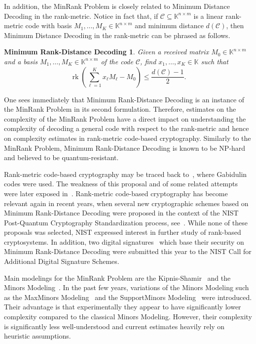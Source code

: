 \documentclass[utf8,latin1]{article}
\newtheorem*{mdd}{Minimum Rank-Distance Decoding}
\DeclareMathOperator{\rk}{rk}
\newcommand{\KK}{\mathbb{K}}
\begin{document}
In addition, the MinRank Problem is closely related to Minimum Distance Decoding in the rank-metric. Notice in fact that, if $\mathcal{C}\subseteq\KK^{n\times m}$ is a linear rank-metric code with basis $M_1,\dots,M_K\in\KK^{n\times m}$ and minimum distance $d(\mathcal{C})$, then Minimum Distance Decoding in the rank-metric can be phrased as follows.

\begin{mdd}
Given a received matrix $M_0\in\KK^{n\times m}$ and a basis $M_1,\dots,M_K\in\KK^{n\times m}$ of the code $\mathcal{C}$, find $x_1,\dots,x_K\in\KK$ such that
\[
\rk\left(\sum_{\ell=1}^K x_\ell M_\ell-M_0\right)\leq\frac{d(\mathcal{C})-1}{2}.
\] 	
\end{mdd}

One sees immediately that Minimum Rank-Distance Decoding is an instance of the MinRank Problem in its second formulation. 
Therefore, estimates on the complexity of the MinRank Problem have a direct impact on understanding the complexity of decoding a general code with respect to the rank-metric and hence on complexity estimates in rank-metric code-based cryptography. Similarly to the MinRank Problem, Minimum Rank-Distance Decoding is known to be NP-hard~\cite{C01} and believed to be quantum-resistant.

Rank-metric code-based cryptography may be traced back to~\cite{GPT91}, where Gabidulin codes were used. The weakness of this proposal and of some related attempts were later exposed in~\cite{O08, FL05, BL04, L10}. Rank-metric code-based cryptography has become relevant again in recent years, when several new cryptographic schemes based on Minimum Rank-Distance Decoding were proposed in the context of the NIST Post-Quantum Cryptography Standardization process, see~\cite{ABDGHRTZ17-LAKE, ABDGHRTZ17-LOCKER, MABBBDGHHZB17-OUROBOROS, MABBBBD19-ROLLO, MABBBDGZ17-RQC, GRSZ14-RANKSIGN, ABGHZ19-DURANDAL}. While none of these proposals was selected, NIST expressed interest in further study of rank-based cryptosystems. In addition, two digital signatures~\cite{CNPRRST23-MEDS, ABBCDFGJRT23-RYDE} which base their security on Minimum Rank-Distance Decoding were submitted this year to the NIST Call for Additional Digital Signature Schemes.

Main modelings for the MinRank Problem are the Kipnis-Shamir~\cite{KS99} and the Minors Modeling~\cite{FLP08, FFS10, FFS13, CG21}. In the past few years, variations of the Minors Modeling such as the MaxMinors Modeling~\cite{BBBGNRT20} and the SupportMinors Modeling~\cite{BBCGPSTV20,BB22} were introduced. Their advantage is that experimentally they appear to have significantly lower complexity compared to the classical Minors Modeling. However, their complexity is significantly less well-understood and current estimates heavily rely on heuristic assumptions.
\end{document}
